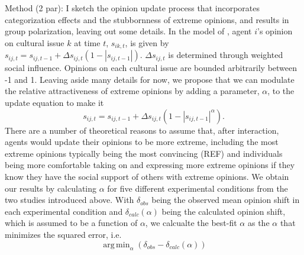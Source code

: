 \documentclass[a4paper,12pt]{article}
\DeclareMathOperator*{\argmin}{arg\,min} %
\begin{document}
Method (2 par):
I sketch the opinion update process that incorporates categorization effects
and the stubbornness of extreme opinions, and results in group polarization,
leaving out some details. In the model of ,
agent $i$'s opinion on cultural issue $k$ at time $t$, $s_{ik,t}$, 
is given by $s_{ij,t} = s_{ij,t-1} + \Delta s_{ij,t} \left ( 1 - |s_{ij,t-1}| \right )$.
$\Delta s_{ij,t}$ is determined through weighted social influence. Opinions on
each cultural issue are bounded arbitrarily between -1 and 1. Leaving aside
many details for now, we propose that we can modulate the relative attractiveness
of extreme opinions by adding a parameter, $\alpha$, to the update equation
to make it 
\[
  s_{ij,t} = s_{ij,t-1} + \Delta s_{ij,t} \left ( 1 - |s_{ij,t-1}|^{\alpha} \right ).
\]
There are a number of theoretical reasons to assume that, after interaction,
agents would update their opinions to be more extreme, including the most
extreme opinions typically being the most convincing (REF) and individuals
being more comfortable taking on and expressing more extreme opinions if 
they know they have the social support of others with extreme opinions. 
We obtain our results by calculating $\alpha$ for five different experimental
conditions from the two studies introduced above. With $\delta_{obs}$ being
the observed mean opinion shift in each experimental condition and 
$\delta_{calc}(\alpha)$ being the calculated opinion shift, which is assumed to
be a function of $\alpha$, we calcualte the best-fit $\alpha$ as the $\alpha$
that minimizes the squared error, i.e.\
\[
  \argmin_{\alpha} \left( \delta_{obs} - \delta_{calc}(\alpha) \right )
\]



\end{document}
